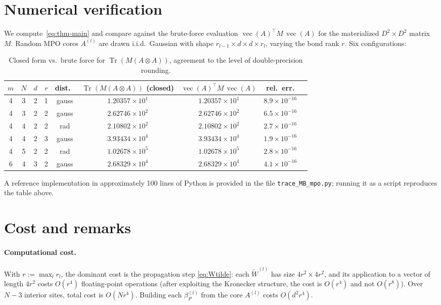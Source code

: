 \documentclass[11pt]{article}
\DeclareMathOperator{\Tr}{Tr}
\DeclareMathOperator{\vecop}{vec}
\newcommand{\Wtilde}{\widetilde{W}}
\begin{document}
\section{Numerical verification}\label{sec:verify}

We compute~\eqref{eq:thm-main} and compare against the brute-force
evaluation $\vecop(A)^\top M\,\vecop(A)$ for the materialized
$D^2\times D^2$ matrix $M$. Random MPO cores $A^{(l)}$ are drawn
i.i.d.~Gaussian with shape $r_{l-1}\times d\times d\times r_l$, varying
the bond rank $r$. Six configurations:

\medskip
\begin{table}[h]
\centering
\begin{tabular}{ccccccccc}
\toprule
$m$ & $N$ & $d$ & $r$ & dist.\ &
$\Tr(M(A\otimes A))$ (closed) & $\vecop(A)^\top M\,\vecop(A)$ & rel.~err.\\
\midrule
4 & 3 & 2 & 1 & gauss   & $1.20357\!\times\!10^{1}$ & $1.20357\!\times\!10^{1}$ & $8.9\!\times\!10^{-16}$\\
4 & 3 & 2 & 2 & gauss   & $2.62746\!\times\!10^{2}$ & $2.62746\!\times\!10^{2}$ & $6.5\!\times\!10^{-16}$\\
4 & 4 & 2 & 2 & rad     & $2.10802\!\times\!10^{2}$ & $2.10802\!\times\!10^{2}$ & $2.7\!\times\!10^{-16}$\\
4 & 4 & 2 & 3 & gauss   & $3.93434\!\times\!10^{4}$ & $3.93434\!\times\!10^{4}$ & $1.9\!\times\!10^{-16}$\\
4 & 5 & 2 & 2 & rad     & $1.02678\!\times\!10^{5}$ & $1.02678\!\times\!10^{5}$ & $2.8\!\times\!10^{-16}$\\
6 & 4 & 3 & 2 & gauss   & $2.68329\!\times\!10^{4}$ & $2.68329\!\times\!10^{4}$ & $4.1\!\times\!10^{-16}$\\
\bottomrule
\end{tabular}
\caption{Closed form vs.\ brute force for $\Tr(M(A\otimes A))$, agreement
to the level of double-precision rounding.}
\label{tab:verify}
\end{table}

A reference implementation in approximately 100 lines of Python is provided
in the file {\tt trace\_MB\_mpo.py}; running it as a script reproduces the
table above.

\section{Cost and remarks}

\paragraph{Computational cost.} With $r := \max_l r_l$, the dominant cost
is the propagation step \eqref{eq:Wtilde}: each $\Wtilde^{(l)}$ has size
$4 r^2 \times 4 r^2$, and its application to a vector of length $4 r^2$
costs $O(r^4)$ floating-point operations (after exploiting the Kronecker
structure, the cost is $O(r^4)$ and not $O(r^8)$). Over $N-3$ interior
sites, total cost is $O(N r^4)$. Building each $\beta_P^{(l)}$ from the
core $A^{(l)}$ costs $O(d^2 r^4)$.
\end{document}
